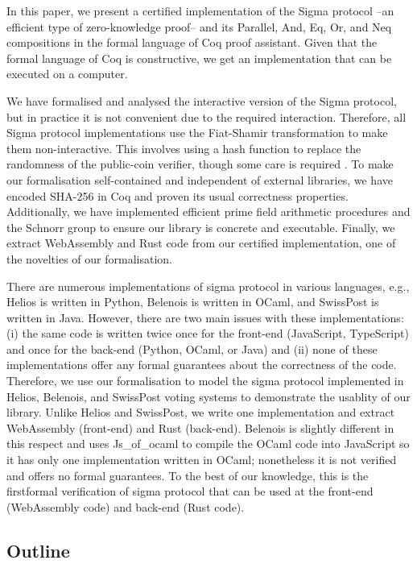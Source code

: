 \documentclass[conference,compsoc]{IEEEtran}
\begin{document}
In this paper, we present a certified implementation of the Sigma protocol --an efficient 
type of zero-knowledge proof-- and its Parallel, And, Eq, Or, and Neq compositions in 
the formal language of Coq proof assistant. Given that the formal language of Coq 
is constructive, we get an implementation that can be executed on a computer. 

We have formalised and analysed the interactive version of 
the Sigma protocol, but in practice it is not convenient due to the required interaction. 
Therefore, all Sigma protocol implementations use the Fiat-Shamir 
transformation \cite{10.5555/36664.36676} to make them non-interactive. This involves 
using a hash function to replace the randomness of the public-coin verifier, though 
some care is required \cite{10.1007/978-3-642-34961-4_38}.
To make our formalisation self-contained and independent of external libraries, we have 
encoded SHA-256 in Coq and proven its usual correctness properties. Additionally, we 
have implemented efficient prime field arithmetic procedures and the Schnorr group to 
ensure our library is concrete and executable. Finally, we extract WebAssembly and 
Rust code from our certified implementation, one of the novelties of our 
formalisation.


There are numerous implementations of sigma protocol in various languages, 
e.g., Helios is written in Python, Belenois is written in OCaml, and SwissPost is written in Java.
However, there are two main issues with these implementations: 
(i) the same code is written twice 
once for the front-end (JavaScript, TypeScript) and once for the back-end (Python, OCaml, or Java) and 
(ii) none of these implementations offer any formal guarantees about the correctness of the code.
Therefore, we use our formalisation to model the sigma protocol implemented in Helios, 
Belenois, and SwissPost voting systems to demonstrate the usablity of 
our library. Unlike Helios and SwissPost,
we write one implementation and extract WebAssembly (front-end) and Rust (back-end). 
Belenois is slightly different in this respect and uses Js\_of\_ocaml 
to compile the OCaml code into JavaScript so it has only one 
implementation written in OCaml; nonetheless it is not verified 
and offers no formal guarantees. To the best of our knowledge, 
this is the firstformal verification of sigma protocol that can be used at 
the front-end (WebAssembly code) and back-end (Rust code). 

\subsection{Outline}
\end{document}
